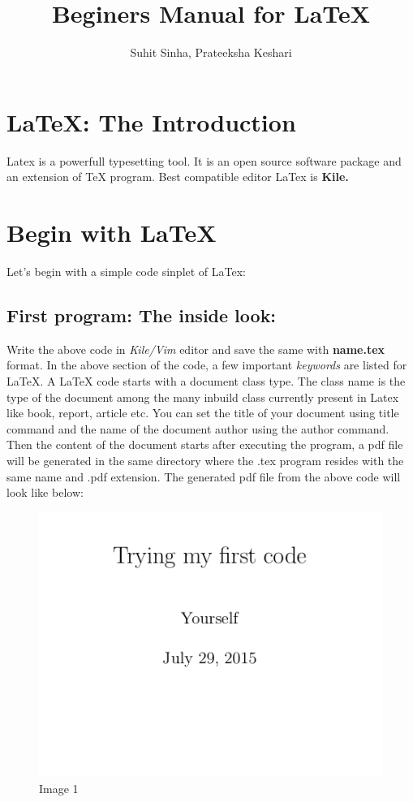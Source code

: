 \documentclass{report}
\title{Beginers Manual for LaTeX}
\author{Suhit Sinha, Prateeksha Keshari}
\begin{document}
 \maketitle
 \newpage
\tableofcontents
\newpage
\chapter{LaTeX: The Introduction}
 
Latex is a powerfull typesetting tool. It is an open source software package and an extension of TeX program. Best compatible editor LaTex is \textbf{Kile.}

\chapter{Begin with LaTeX}
Let's begin with a simple code sinplet of LaTex:
  
  \vspace{2mm}

\section{First program: The inside look:}  

  Write the above code in \textit{Kile/Vim} editor and save the same with \textbf{name.tex} format.
In the above section of the code, a few important \textit{keywords} are listed for LaTeX. A LaTeX code starts with a document class type. The class name is the type of the document among the many inbuild class currently present in Latex like book, report, article etc. You can set the title of your document using title command and the name of the document author using the author command. Then the content of the document starts after executing the program, a pdf file will be generated in the same directory where the .tex program resides with the same name and .pdf extension. The generated pdf file from the above code will look like below:
\newline
\vspace{5mm}
\begin{figure}[h!]
\centering
\includegraphics[scale=.5]{./lab2.png}
\caption{Image 1}
\end{figure}
\end{document}
